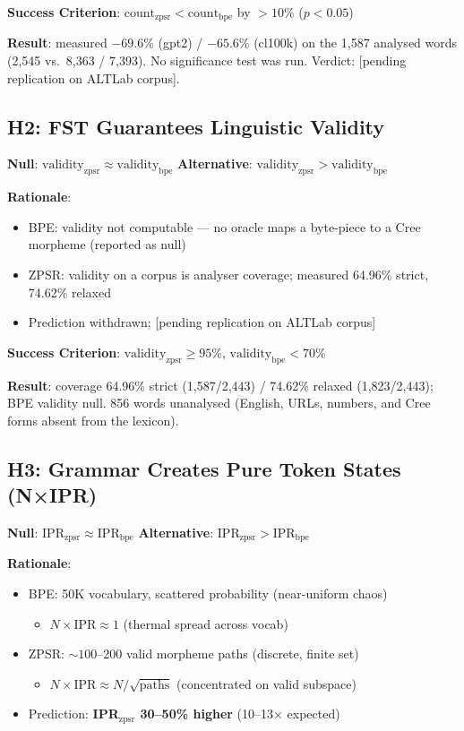 \documentclass[11pt,oneside]{article}
\begin{document}
\textbf{Success Criterion}: $\text{count}_{\text{zpsr}} < \text{count}_{\text{bpe}}$ by $>10\%$ ($p < 0.05$)

\textbf{Result}: measured $-69.6\%$ (gpt2) / $-65.6\%$ (cl100k) on the 1,587 analysed words (2,545 vs.\ 8,363 / 7,393). No significance test was run. Verdict: [pending replication on ALTLab corpus].

\subsection{H2: FST Guarantees Linguistic Validity}

\textbf{Null}: $\text{validity}_{\text{zpsr}} \approx \text{validity}_{\text{bpe}}$
\textbf{Alternative}: $\text{validity}_{\text{zpsr}} > \text{validity}_{\text{bpe}}$

\textbf{Rationale}:
\begin{itemize}
  \item BPE: validity not computable --- no oracle maps a byte-piece to a Cree morpheme (reported as null)
  \item ZPSR: validity on a corpus is analyser coverage; measured 64.96\% strict, 74.62\% relaxed
  \item Prediction withdrawn; [pending replication on ALTLab corpus]
\end{itemize}

\textbf{Success Criterion}: $\text{validity}_{\text{zpsr}} \geq 95\%$, $\text{validity}_{\text{bpe}} < 70\%$

\textbf{Result}: coverage 64.96\% strict (1,587/2,443) / 74.62\% relaxed (1,823/2,443); BPE validity null. 856 words unanalysed (English, URLs, numbers, and Cree forms absent from the lexicon).

\subsection{H3: Grammar Creates Pure Token States (N×IPR)}

\textbf{Null}: $\text{IPR}_{\text{zpsr}} \approx \text{IPR}_{\text{bpe}}$
\textbf{Alternative}: $\text{IPR}_{\text{zpsr}} > \text{IPR}_{\text{bpe}}$

\textbf{Rationale}:
\begin{itemize}
  \item BPE: 50K vocabulary, scattered probability (near-uniform chaos)
  \begin{itemize}
    \item $N \times \text{IPR} \approx 1$ (thermal spread across vocab)
  \end{itemize}
  \item ZPSR: $\sim 100$--200 valid morpheme paths (discrete, finite set)
  \begin{itemize}
    \item $N \times \text{IPR} \approx N / \sqrt{\text{paths}}$ (concentrated on valid subspace)
  \end{itemize}
  \item Prediction: \textbf{IPR$_{\text{zpsr}}$ 30--50\% higher} (10--13× expected)
\end{itemize}
\end{document}
